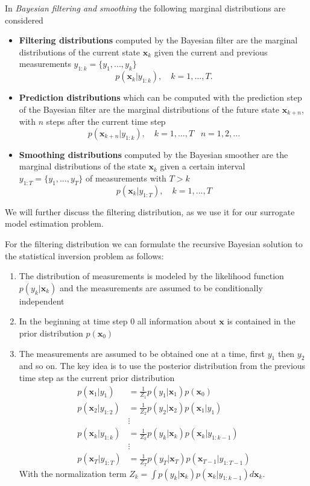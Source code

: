 In \textit{Bayesian filtering and smoothing} the following marginal
distributions are considered

\begin{itemize}
\item \textbf{Filtering distributions} computed by the
  Bayesian filter are the marginal distributions of the
  current state $\mathbf{x}_k$ given the current and previous measurements
  $y_{1:k} = \{y_1,...,y_k\}$
  $$ p(\mathbf{x}_k | y_{1:k}), \quad k = 1,...,T.$$
\item \textbf{Prediction distributions} which can be computed with
  the prediction step of the Bayesian filter are the marginal
  distributions of the future state $\mathbf{x}_{k+n}$, with $n$ steps
  after the current time step
  $$ p(\mathbf{x}_{k+n} | y_{1:k}), \quad k = 1,...,T \;\;\; n = 1,2,...$$
\item \textbf{Smoothing distributions} computed by the Bayesian smoother
  are the marginal distributions of the state $\mathbf{x}_k$ given
  a certain interval $y_{1:T} = \{y_1,...,y_T\}$ of measurements with
  $T > k$
  $$ p(\mathbf{x}_k | y_{1:T}), \quad k = 1,...,T$$
\end{itemize}

We will further discuss the filtering distribution,
as we use it for our surrogate model estimation problem.

For the filtering distribution we can formulate the recursive Bayesian
solution to the statistical inversion problem as follows:
\begin{enumerate}
\item The distribution of measurements is modeled by the likelihood
  function $p(y_k | \mathbf{x}_k)$ and the measurements are assumed
  to be conditionally independent
\item In the beginning at time step 0 all information about $\mathbf{x}$
  is contained in the prior distribution $p(\mathbf{x}_0)$
\item The measurements are assumed to be obtained one at a time,
  first $y_1$ then $y_2$ and so on. The key idea is to use the posterior
  distribution from the previous time step as the current prior
  distribution
  \begin{align*}
    p(\mathbf{x}_1 | y_{1}) &= \frac{1}{Z_1} p(y_1 | \mathbf{x}_1) p(\mathbf{x}_0) \\
    p(\mathbf{x}_2 | y_{1:2}) &= \frac{1}{Z_2} p(y_2 | \mathbf{x}_2) p(\mathbf{x}_1 | y_1) \\
                            &\vdots \\
    p(\mathbf{x}_k | y_{1:k}) &= \frac{1}{Z_k} p(y_k | \mathbf{x}_k)
                                p(\mathbf{x}_k | y_{1:k-1}) \\
                            &\vdots \\
    p(\mathbf{x}_T | y_{1:T}) &= \frac{1}{Z_T} p(y_T | \mathbf{x}_T) p(\mathbf{x}_{T-1} | y_{1:T-1})
  \end{align*}
  With the normalization term $Z_k = \int p(y_k | \mathbf{x}_k)
  p(\mathbf{x}_k | y_{1:k-1})
  d \mathbf{x}_k$. 
\end{enumerate}

